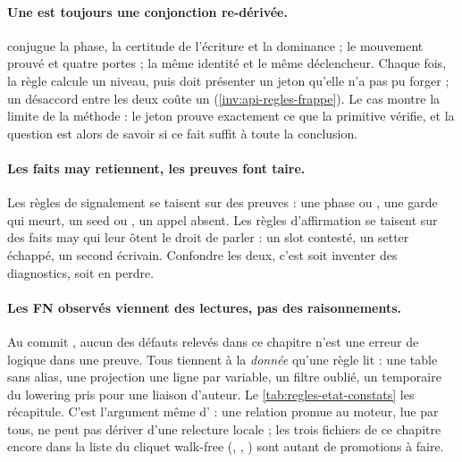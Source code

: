 \paragraph{Une \Error{} est toujours une conjonction re-dérivée.}  conjugue la phase, la certitude de l'écriture et la dominance ;  le mouvement prouvé et quatre portes ;  la même identité et le même déclencheur. Chaque fois, la règle calcule un niveau, puis doit présenter un jeton qu'elle n'a pas pu forger ; un désaccord entre les deux coûte un \Warning{} (\cref{inv:api-regles-frappe}). Le cas  montre la limite de la méthode : le jeton prouve exactement ce que la primitive vérifie, et la question est alors de savoir si ce fait suffit à \og toute la conclusion\fg.

\paragraph{Les faits may retiennent, les preuves font taire.} Les règles de signalement se taisent sur des preuves : une phase  ou , une garde qui meurt, un seed  ou , un appel absent. Les règles d'affirmation se taisent sur des faits may qui leur ôtent le droit de parler : un slot contesté, un setter échappé, un second écrivain. Confondre les deux, c'est soit inventer des diagnostics, soit en perdre.

\paragraph{Les FN observés viennent des lectures, pas des raisonnements.} Au commit \snapshotCommit, aucun des défauts relevés dans ce chapitre n'est une erreur de logique dans une preuve. Tous tiennent à la \emph{donnée} qu'une règle lit : une table sans alias, une projection \og une ligne par variable\fg, un filtre  oublié, un temporaire du lowering pris pour une liaison d'auteur. Le \cref{tab:regles-etat-constats} les récapitule. C'est l'argument même d' : une relation promue au moteur, lue par tous, ne peut pas dériver d'une relecture locale ; les trois fichiers de ce chapitre encore dans la liste du cliquet \og walk-free\fg{} (, , ) sont autant de promotions à faire.

